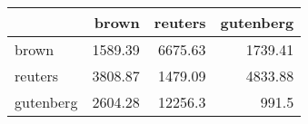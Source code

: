 \begin{tabular}{lrrr}
\hline
           &   brown &   reuters &   gutenberg \\
\hline
 brown     & 1589.39 &   6675.63 &     1739.41 \\
 reuters   & 3808.87 &   1479.09 &     4833.88 \\
 gutenberg & 2604.28 &  12256.3  &      991.5  \\
\hline
\end{tabular}